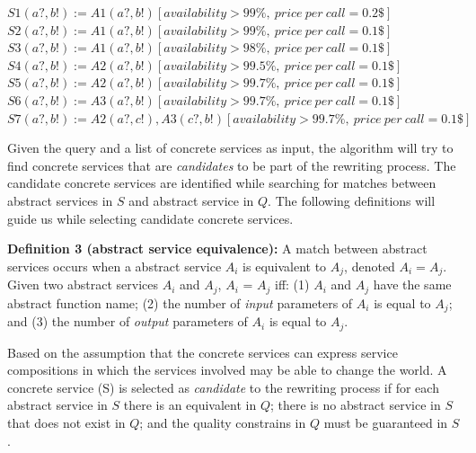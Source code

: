 \documentclass[12pt,a4paper,oneside]{article}
\begin{document}
\begin{flushleft}
$S1 (a?, b!) := A1(a?, b!)[availability > 99\%, \ price \ per \ call = 0.2\$]$ \\
$S2 (a?, b!) := A1(a?, b!)[availability > 99\%, \ price \ per \ call = 0.1\$]$ \\
$S3 (a?, b!) := A1(a?, b!)[availability > 98\%, \ price \ per \ call = 0.1\$]$ \\
$S4 (a?, b!) := A2(a?, b!)[availability > 99.5\%, \ price \ per \ call = 0.1\$]$ \\
$S5 (a?, b!) := A2(a?, b!)[availability > 99.7\%, \ price \ per \ call = 0.1\$]$ \\
$S6 (a?, b!) := A3(a?, b!)[availability > 99.7\%, \ price \ per \ call = 0.1\$]$ \\
$S7 (a?, b!) := A2(a?, c!),A3(c?, b!)[availability > 99.7\%, \ price \ per \ call = 0.1\$]$ \\
\end{flushleft}

Given the query and a list of concrete services as input, the algorithm will try to find concrete services that are \textit{candidates} to be part of the rewriting process.
The candidate concrete services are identified while searching for matches between abstract services in $S$ and abstract service in $Q$. 
The following definitions will guide us while selecting candidate concrete services.

\noindent \textbf{Definition 3 (abstract service equivalence):} 
A match between abstract services occurs when a abstract service $A_{i}$ is equivalent to $A_{j}$, denoted $A_{i} = A_{j}$. Given two abstract services $A_{i}$ and $A_{j}$, $A_{i}$ = $A_{j}$ iff: (1) $A_{i}$ and $A_{j}$ have the same abstract function name; (2) the number of \textit{input} parameters of $A_{i}$ is equal to $A_{j}$; and (3) the number of \textit{output} parameters of $A_{i}$ is equal to $A_{j}$.



Based on the assumption that the concrete services can express service compositions in which the services involved may be able to change the world.  
A concrete service (S) is selected as \textit{candidate} to the rewriting process if for each abstract service in $S$ there is an equivalent in $Q$; there is no abstract service in $S$ that does not exist in $Q$; and the quality constrains in $Q$ must be guaranteed in $S$.
\end{document}
